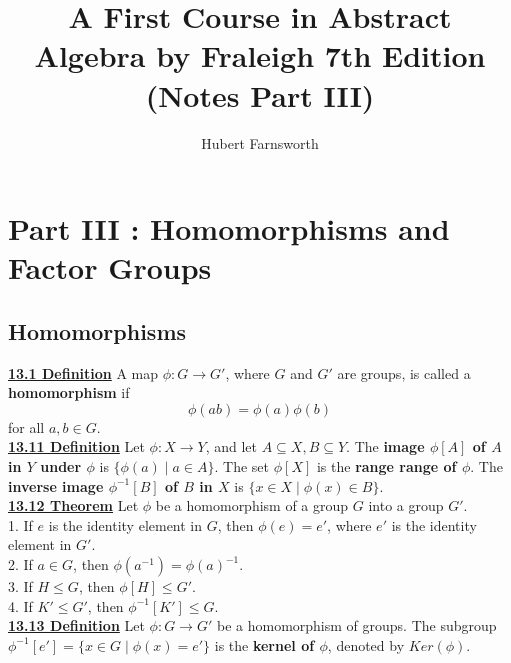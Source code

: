 \documentclass[12pt, letterpaper]{article}
\begin{document}
\title{A First Course in Abstract Algebra by Fraleigh 7th Edition (Notes Part III)}
\author{Hubert Farnsworth }  
\begin{titlepage}
\maketitle
\end{titlepage}
 

 
\section{Part III : Homomorphisms and Factor Groups}


\subsection{Homomorphisms}

\noindent \underline{\bf 13.1 Definition} A map $\phi : G \rightarrow G'$, where $G$ and $G'$ are groups, is called a {\bf homomorphism} if $$ \phi(ab) = \phi(a)\phi(b)$$ for all $a,b \in G$.\\

\noindent \underline{\bf 13.11 Definition} Let $\phi : X \rightarrow Y$, and let $A \subseteq X, B \subseteq Y$. The {\bf image $\phi[A]$ of $A$ in $Y$ under $\phi$} is $\{\phi(a) \; | \; a \in A\}$. The set $\phi[X]$ is the {\bf range range of $\phi$}. The {\bf inverse image $\phi^{-1}[B]$ of $B$ in $X$} is $\{x \in X \; | \; \phi(x) \in B\}$. \\

\noindent \underline{\bf 13.12 Theorem} Let $\phi$ be a homomorphism of a group $G$ into a group $G'$.\\

1. If $e$ is the identity element in $G$, then $\phi(e) =e'$, where $e'$ is the identity element in $G'$. \\

2. If $a \in G$, then $\phi(a^{-1}) = \phi(a)^{-1}$. \\

3. If $H \leq G$, then $\phi[H] \leq G'$. \\

4. If $K' \leq G'$, then $\phi^{-1}[K'] \leq G$. \\

\noindent \underline{\bf 13.13 Definition} Let $\phi : G \rightarrow G'$ be a homomorphism of groups. The subgroup $\phi^{-1}[{e'}] = \{x \in G \; | \; \phi(x) = e'\}$ is the {\bf kernel of $\phi$}, denoted by $Ker(\phi)$. \\
\end{document}
